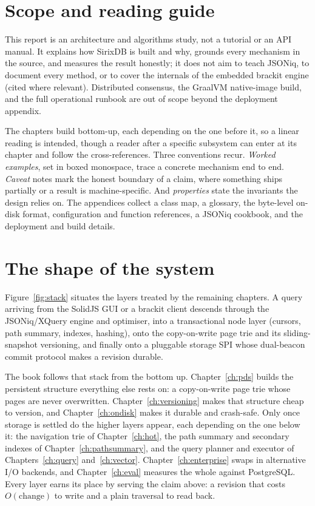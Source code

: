 \documentclass[11pt,a4paper,oneside]{report}
\theoremstyle{sirixthm}
\begin{document}
\section{Scope and reading guide}

This report is an architecture and algorithms study, not a tutorial or an API manual. It explains how
SirixDB is built and why, grounds every mechanism in the source, and measures the result honestly; it
does not aim to teach JSONiq, to document every method, or to cover the internals of the embedded brackit
engine (cited where relevant). Distributed consensus, the GraalVM native-image build, and the full
operational runbook are out of scope beyond the deployment appendix.

The chapters build bottom-up, each depending on the one before it, so a linear reading is intended,
though a reader after a specific subsystem can enter at its chapter and follow the cross-references.
Three conventions recur. \emph{Worked examples}, set in boxed monospace, trace a concrete mechanism end
to end. \emph{Caveat} notes mark the honest boundary of a claim, where something ships partially or a
result is machine-specific. And \emph{properties} state the invariants the design relies on. The
appendices collect a class map, a glossary, the byte-level on-disk format, configuration and function
references, a JSONiq cookbook, and the deployment and build details.

\section{The shape of the system}

Figure~\ref{fig:stack} situates the layers treated by the remaining chapters. A query
arriving from the SolidJS GUI or a brackit client descends through the JSONiq/XQuery
engine and optimiser, into a transactional node layer (cursors, path summary, indexes,
hashing), onto the copy-on-write page trie and its sliding-snapshot versioning, and
finally onto a pluggable storage SPI whose dual-beacon commit protocol makes a revision
durable.

The book follows that stack from the bottom up. Chapter~\ref{ch:pds} builds the persistent
structure everything else rests on: a copy-on-write page trie whose pages are never
overwritten. Chapter~\ref{ch:versioning} makes that structure cheap to version, and
Chapter~\ref{ch:ondisk} makes it durable and crash-safe. Only once storage is settled do
the higher layers appear, each depending on the one below it: the navigation trie of
Chapter~\ref{ch:hot}, the path summary and secondary indexes of
Chapter~\ref{ch:pathsummary}, and the query planner and executor of
Chapters~\ref{ch:query} and~\ref{ch:vector}. Chapter~\ref{ch:enterprise} swaps in
alternative I/O backends, and Chapter~\ref{ch:eval} measures the whole against PostgreSQL.
Every layer earns its place by serving the claim above: a revision that costs
$O(\text{change})$ to write and a plain traversal to read back.
\end{document}
